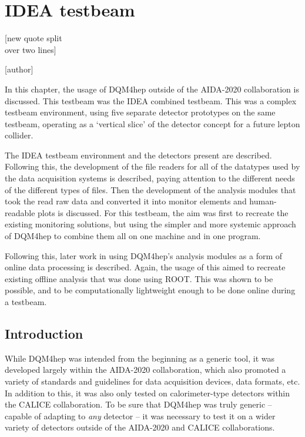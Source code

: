 
\chapter{\acrshort{IDEA} testbeam}
\label{chapter:ideatestbeam}

\epigraph{[new quote split \\ over two lines]}{[author]}

In this chapter, the usage of \acrshort{DQM4hep} outside of the AIDA-2020 collaboration is discussed. This testbeam was the \acrfull{IDEA} combined testbeam. This was a complex testbeam environment, using five separate detector prototypes on the same testbeam, operating as a `vertical slice' of the detector concept for a future lepton collider.

The \acrshort{IDEA} testbeam environment and the detectors present are described. Following this, the development of the file readers for all of the datatypes used by the data acquisition systems is described, paying attention to the different needs of the different types of files. Then the development of the analysis modules that took the read raw data and converted it into monitor elements and human-readable plots is discussed. For this testbeam, the aim was first to recreate the existing monitoring solutions, but using the simpler and more systemic approach of \acrshort{DQM4hep} to combine them all on one machine and in one program. 

Following this, later work in using \acrshort{DQM4hep}'s analysis modules as a form of online data processing is described. Again, the usage of this aimed to recreate existing offline analysis that was done using ROOT. This was shown to be possible, and to be computationally lightweight enough to be done online during a testbeam.

\section{Introduction}
While \acrshort{DQM4hep} was intended from the beginning as a generic tool, it was developed largely within the AIDA-2020 collaboration, which also promoted a variety of standards and guidelines for data acquisition devices, data formats, etc. In addition to this, it was also only tested on calorimeter-type detectors within the \acrshort{CALICE} collaboration. To be sure that \acrshort{DQM4hep} was truly generic -- capable of adapting to \textit{any} detector -- it was necessary to test it on a wider variety of detectors outside of the AIDA-2020 and \acrshort{CALICE} collaborations.

